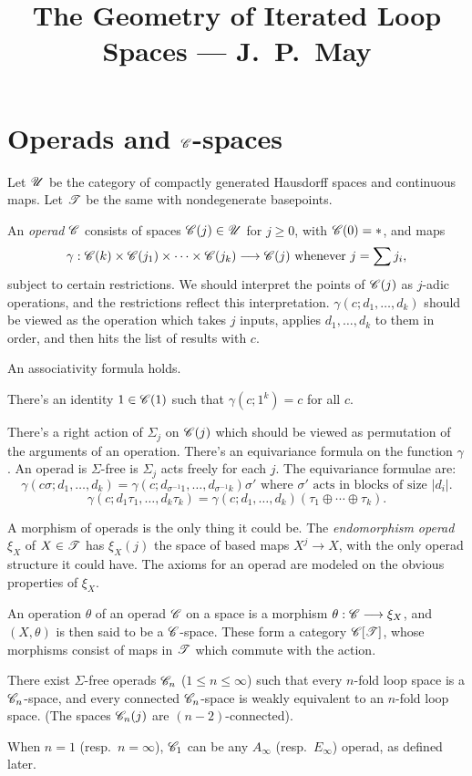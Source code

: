 \documentclass[11pt]{article}
\title{The Geometry of Iterated Loop Spaces\small{ --- J.\ P.\ May}}
\author{}
\date{}
\begin{document}
\tableofcontents

\section{Operads and \texorpdfstring{$\mathscr{C}$}{C}-spaces}
Let $\mathscr{U}$ be the category of compactly generated Hausdorff spaces and continuous
 maps. 
Let $\mathscr{T}$ be the same with nondegenerate basepoints.

An \emph{operad} $\mathscr{C}$ consists of spaces $\mathscr{C}(j)\in\mathscr{U}$ for $j\geq0$,
 with $\mathscr{C}(0)=*$, and maps
\[\gamma:\mathscr{C}(k)\times\mathscr{C}(j_1)\times\cdots\times\mathscr{C}(j_k)\longrightarrow\mathscr{C}(j)
\text{ whenever }j=\sum j_i,\]
subject to certain restrictions. We should interpret the points of $\mathscr{C}(j)$ as
$j$-adic operations, and the restrictions reflect this interpretation.
$\gamma(c;d_1,\ldots,d_k)$ should be viewed as the operation which takes $j$
inputs, applies $d_1,\ldots,d_k$ to them in order, and then hits the list of
results with $c$.
\begin{itemise}
\item An associativity formula holds.
\item There's an identity $1\in\mathscr{C}(1)$ such that $\gamma(c;1^k)=c$ for all $c$.
\item There's a right action of $\Sigma_j$ on $\mathscr{C}(j)$ which should be viewed as
permutation of the arguments of an operation. There's an equivariance formula on
the function $\gamma$. An operad is $\Sigma$-free is $\Sigma_j$ acts freely for
each $j$. The equivariance formulae are:
\[\gamma(c\sigma;d_1,\ldots,d_k)=\gamma(c;d_{\sigma^{-1}1},\ldots,
d_{\sigma^{-1}k})\sigma'\text{ where }\sigma'\text{ acts in 
blocks of size $|d_i|$}.\]
\[\gamma(c;d_1\tau_1,\ldots,d_k\tau_k)=\gamma(c;d_1,\ldots,d_k)(\tau_1\oplus
\cdots\oplus\tau_k).\]
\end{itemise}
A morphism of operads is the only thing it could be. The \emph{endomorphism
operad} $\xi_X$ of $X\in\mathscr{T}$ has $\xi_X(j)$ the space of based maps $X^j\to
X$, with the only operad structure it could have. The axioms for an operad are
modeled on the obvious properties of $\xi_X$.

An operation $\theta$ of an operad $\mathscr{C}$ on a space is a morphism
$\theta:\mathscr{C}\longrightarrow\xi_X$, and $(X,\theta)$ is then said to be a $\mathscr{C}$-space. These
form a category $\mathscr{C}[\mathscr{T}]$, whose morphisms consist of maps in $\mathscr{T}$ which
commute with the action.
\begin{thm*}[1.3]
There exist $\Sigma$-free operads $\mathscr{C}_n$ ($1\leq n\leq\infty$) such that every
$n$-fold loop space is a $\mathscr{C}_n$-space, and every connected $\mathscr{C}_n$-space
is weakly equivalent to an $n$-fold loop space. (The spaces $\mathscr{C}_n(j)$ are 
$(n-2)$-connected).
\end{thm*}
When $n=1$  (resp.\ $n=\infty$), $\mathscr{C}_1$ can be any $A_\infty$ 
(resp.\ $E_\infty$) operad, as defined later.
\end{document}
